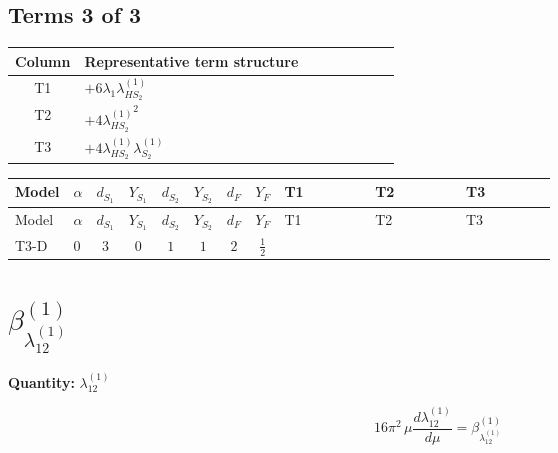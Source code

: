 \documentclass[8pt]{article}
\begin{document}
\begin{landscape}
\subsection*{Terms 3 of 3}
\begin{center}
\begin{tabular}{@{}c >{\raggedright\arraybackslash}p{0.82\linewidth}@{}}
\toprule
Column & Representative term structure \\
\midrule
T1 & \(\displaystyle +6 {\lambda_1} {\lambda_{HS_2}^{(1)}}\) \\
\midrule
T2 & \(\displaystyle +4 {\lambda_{HS_2}^{(1)}}^2\) \\
\midrule
T3 & \(\displaystyle +4 {\lambda_{HS_2}^{(1)}} {\lambda_{S_2}^{(1)}}\) \\
\midrule
\bottomrule
\end{tabular}
\end{center}
\smallskip
\tiny
\begin{longtable}{@{}llcccccc >{\raggedright\arraybackslash}p{0.21\linewidth} >{\raggedright\arraybackslash}p{0.21\linewidth} >{\raggedright\arraybackslash}p{0.21\linewidth}@{}}
\toprule
Model & $\alpha$ & $d_{S_1}$ & $Y_{S_1}$ & $d_{S_2}$ & $Y_{S_2}$ & $d_F$ & $Y_F$ & T1 & T2 & T3 \\
\midrule
\endfirsthead
\toprule
Model & $\alpha$ & $d_{S_1}$ & $Y_{S_1}$ & $d_{S_2}$ & $Y_{S_2}$ & $d_F$ & $Y_F$ & T1 & T2 & T3 \\
\midrule
\endhead
T3-D & $0$ & $3$ & $0$ & $1$ & $1$ & $2$ & $\frac{1}{2}$ & \scriptsize\adjustbox{max width=\linewidth}{$\begin{gathered} +6 {\lambda_1} {\lambda_{HS_2}^{(1)}}\end{gathered}$} & \scriptsize\adjustbox{max width=\linewidth}{$\begin{gathered} +4 {\lambda_{HS_2}^{(1)}}^2\end{gathered}$} & \scriptsize\adjustbox{max width=\linewidth}{$\begin{gathered} +4 {\lambda_{HS_2}^{(1)}} {\lambda_{S_2}^{(1)}}\end{gathered}$} \\
\midrule
\bottomrule
\end{longtable}
\clearpage
\section*{$\beta_{\lambda_{12}^{(1)}}^{(1)}$}
\noindent\textbf{Quantity: }$\lambda_{12}^{(1)}$\par\smallskip
\[16\pi^2\,\mu\frac{d \lambda_{12}^{(1)}}{d\mu}=\beta_{\lambda_{12}^{(1)}}^{(1)}\]

\end{landscape}
\end{document}
